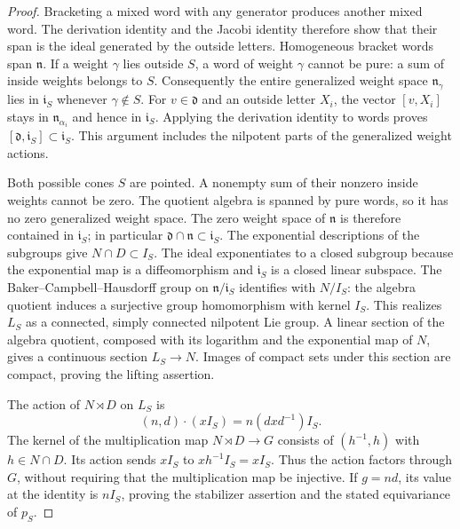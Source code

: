 \begin{proof}
Bracketing a mixed word with any generator produces another mixed word.
The derivation identity and the Jacobi identity therefore show that their
span is the ideal generated by the outside letters.  Homogeneous bracket
words span $\mathfrak n$.  If a weight $\gamma$ lies outside $S$, a word of
weight $\gamma$ cannot be pure: a sum of inside weights belongs to $S$.
Consequently the entire generalized weight space
$\mathfrak n_\gamma$ lies in $\mathfrak i_S$ whenever $\gamma\notin S$.
For $v\in\mathfrak d$ and an outside letter $X_i$, the vector $[v,X_i]$
stays in $\mathfrak n_{\alpha_i}$ and hence in $\mathfrak i_S$.
Applying the derivation identity to words proves
$[\mathfrak d,\mathfrak i_S]\subset\mathfrak i_S$.  This argument includes
the nilpotent parts of the generalized weight actions.

Both possible cones $S$ are pointed.  A nonempty sum of their nonzero
inside weights cannot be zero.  The quotient algebra is spanned by pure
words, so it has no zero generalized weight space.  The zero weight space
of $\mathfrak n$ is therefore contained in $\mathfrak i_S$; in particular
$\mathfrak d\cap\mathfrak n\subset\mathfrak i_S$.
The exponential descriptions of the subgroups give $N\cap D\subset I_S$.
The ideal exponentiates to a closed subgroup because the exponential map
is a diffeomorphism and $\mathfrak i_S$ is a closed linear subspace.
The Baker--Campbell--Hausdorff group on $\mathfrak n/\mathfrak i_S$
identifies with $N/I_S$: the algebra quotient induces a surjective group
homomorphism with kernel $I_S$.  This realizes $L_S$ as a connected,
simply connected nilpotent Lie group.  A linear section of the algebra
quotient, composed with its logarithm and the exponential map of $N$,
gives a continuous section $L_S\to N$.  Images of compact sets under
this section are compact, proving the lifting assertion.

The action of $N\rtimes D$ on $L_S$ is
\[
 (n,d)\cdot(xI_S)=n(dxd^{-1})I_S.
\]
The kernel of the multiplication map $N\rtimes D\to G$ consists of
$(h^{-1},h)$ with $h\in N\cap D$.  Its action sends $xI_S$ to
$xh^{-1}I_S=xI_S$.  Thus the action factors through $G$, without requiring
that the multiplication map be injective.  If $g=nd$, its value at the
identity is $nI_S$, proving the stabilizer assertion and the stated
equivariance of $p_S$.


\end{proof}
